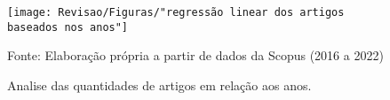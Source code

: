 \begin{figure}[H]
	\centering
	\caption{Analise das quantidades de artigos em relação aos anos.}
	\label{fig:regressao-linear-dos-artigos-baseados-nos-anos}
	\texttt{[image: Revisao/Figuras/"regressão linear dos artigos baseados nos anos"]}
	
	\vspace{0.2cm}
	Fonte: Elaboração própria a partir de dados da Scopus (2016 a 2022)
\end{figure}